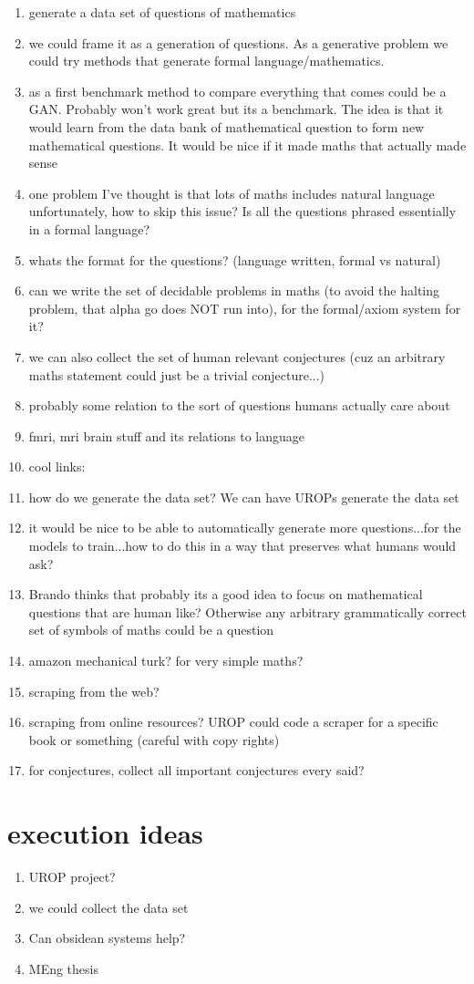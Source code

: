 \documentclass[11pt]{article}
\begin{document}
\begin{enumerate}
\item generate a data set of questions of mathematics
\item we could frame it as a generation of questions. As a generative problem we could try methods that generate formal language/mathematics.
\item as a first benchmark method to compare everything that comes could be a GAN. Probably won't work great but its a benchmark. The idea is that it would learn from the data bank of mathematical question to form new mathematical questions. It would be nice if it made maths that actually made sense
\item one problem I've thought is that lots of maths includes natural language unfortunately, how to skip this issue? Is all the questions phrased essentially in a formal language?
\item whats the format for the questions? (language written, formal vs natural)
\item can we write the set of decidable problems in maths (to avoid the halting problem, that alpha go does NOT run into), for the formal/axiom system for it?
\item we can also collect the set of human relevant conjectures (cuz an arbitrary maths statement could just be a trivial conjecture...)
\item probably some relation to the sort of questions humans actually care about
\item fmri, mri brain stuff and its relations to language
\item cool links: %
\item how do we generate the data set? We can have UROPs generate the data set
\item it would be nice to be able to automatically generate more questions...for the models to train...how to do this in a way that preserves what humans would ask?
\item Brando thinks that probably its a good idea to focus on mathematical questions that are human like? Otherwise any arbitrary grammatically correct set of symbols of maths could be a question
\item amazon mechanical turk? for very simple maths?
\item scraping from the web?
\item scraping from online resources? UROP could code a scraper for a specific book or something (careful with copy rights)
\item for conjectures, collect all important conjectures every said?
\end{enumerate}

\section{execution ideas}

\begin{enumerate}
\item UROP project?
\item we could collect the data set
\item Can obsidean systems help?
\item MEng thesis
\end{enumerate}

\printbibliography
\end{document}
